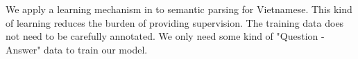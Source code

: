 We apply a learning mechanism in to semantic parsing for Vietnamese. This kind of learning reduces the burden of providing supervision. The training data does not need to be carefully annotated. We only need some kind of "Question - Answer" data to train our model. 